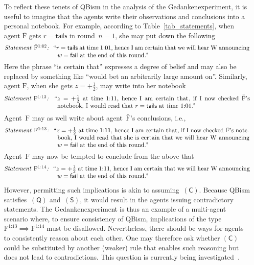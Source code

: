 \documentclass{article}
\theoremstyle{mystyle}
\theoremstyle{definition}
\newcommand*{\Friendone}{\mathrm{\bar{F}}}
\newcommand*{\Friendtwo}{\mathrm{F}}
\newcommand*{\Wigner}{\mathrm{W}}
\newcommand*{\splus}{{\textstyle + \frac{1}{2}}}
\newcommand*{\QT}{\mathsf{(Q)}}
\newcommand*{\SW}{\mathsf{(S)}}
\newcommand*{\SelfCons}{\mathsf{(C)}}
\newcommand*{\fail}{\mathsf{fail}}
\newcommand*{\tail}{\mathsf{tails}}
\newcommand*{\asn}[1]{``#1''}
\newcommand*{\sT}[1]{{\text{\emph{Statement} $#1$\emph{:} }}}
\newcommand*{\sTM}[1]{\begin{minipage}{14cm} \hangindent=8.6em  #1 \end{minipage}}
\begin{document}
To reflect these tenets of QBism in the analysis of the Gedankenexperiment, it is useful to imagine that the agents write their observations and conclusions into a personal notebook.  For example, according to Table~\ref{tab_statements}, when agent $\Friendone$ gets $r=\tail$ in round~$n=1$, she may put down the following 
\begin{align*}
  \sTM{\sT{\Friendone^{\text{1:02}}} \asn{$r=\tail$ at time $\text{1:01}$,  hence I am certain that we will hear $\Wigner$ announcing $w = \fail$ at the end of this round.}}
\end{align*}
Here the phrase ``is certain that'' expresses a degree of belief and may also be replaced by something like ``would bet an arbitrarily large amount on''. Similarly, agent $\Friendtwo$, when she gets $z=\splus$, may write into her notebook 
\begin{align*}
  \sTM{\sT{\Friendtwo^{\text{1:12}}} \asn{$z=\splus$ at time $\text{1:11}$, hence I am certain that, if I now checked $\Friendone$'s notebook, I would read that $r=\tail$ at time $\text{1:01}$.}}
\end{align*}
Agent~$\Friendtwo$ may as well write about agent~$\Friendone$'s conclusions, i.e., 
\begin{align*}
  \sTM{\sT{\Friendtwo^{\text{1:13}}} \asn{$z=\splus$ at time $\text{1:11}$, hence I am certain that, if I now checked $\Friendone$'s notebook, I would read that she is certain that we will hear $\Wigner$ announcing $w = \fail$ at the end of this round.}}
\end{align*}
 Agent~$\Friendtwo$ may now be tempted to conclude from the above that
\begin{align*}
  \sTM{\sT{\Friendtwo^{\text{1:14}}} \asn{$z=\splus$ at time $\text{1:11}$, hence I am certain that we will hear $\Wigner$ announcing $w = \fail$ at the end of this round.}}
\end{align*}

However, permitting such implications is akin to assuming~$\SelfCons$. Because QBism  satisfies~$\QT$ and~$\SW$, it would result in the agents issuing contradictory statements. The Gedankenexperiment is thus an example of a multi-agent scenario where,  to ensure consistency of QBism, implications of the type $\Friendtwo^{\text{1:13}} \implies \Friendtwo^{\text{1:14}}$ must be disallowed.  Nevertheless, there should be ways for  agents to  consistently reason about each other. One may therefore ask whether $\SelfCons$ could be substituted by another (weaker) rule that enables such reasoning but does not lead to contradictions. This question is currently being investigated~\cite{DFS18}.
\end{document}
